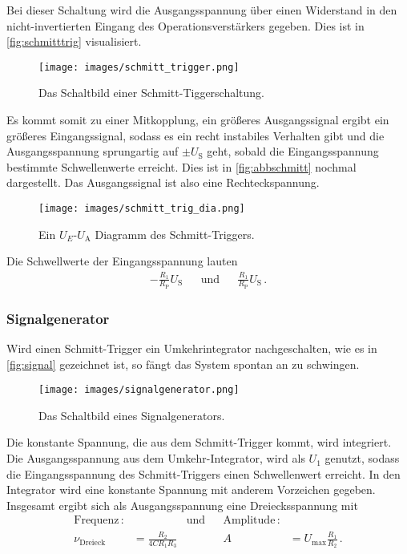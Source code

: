             \noindent 
            Bei dieser Schaltung wird die Ausgangsspannung über einen Widerstand in den nicht-invertierten Eingang des Operationsverstärkers gegeben.
            Dies ist in \autoref{fig:schmitttrig} visualisiert.
            \begin{figure}[H]
                \centering
                \texttt{[image: images/schmitt\_trigger.png]}
                \caption{Das Schaltbild einer Schmitt-Tiggerschaltung. \cite{V51}}
                \label{fig:schmitttrig}
            \end{figure}
            Es kommt somit zu einer Mitkopplung, ein größeres Ausgangssignal ergibt ein größeres Eingangssignal, sodass es ein recht instabiles Verhalten gibt 
            und die Ausgangsspannung sprungartig auf $\pm U_\text{S}$ geht, sobald die Eingangsspannung bestimmte Schwellenwerte erreicht. 
            Dies ist in \autoref{fig:abbschmitt} nochmal dargestellt. Das Ausgangssignal ist also eine Rechteckspannung.
            \begin{figure}[H]
                \centering
                \texttt{[image: images/schmitt\_trig\_dia.png]}
                \caption{Ein $U_E$-$U_\text{A}$ Diagramm des Schmitt-Triggers. \cite{Joachim}}
                \label{fig:abbschmitt}
            \end{figure}
            Die Schwellwerte der Eingangsspannung lauten 
            \begin{align*}
                - \frac{R_1}{R_\text{P}} U_\text{S} && \text{und} && \frac{R_1}{R_\text{P}} U_\text{S} \, .
            \end{align*}

        \subsubsection{Signalgenerator}

            \noindent 
            Wird einen Schmitt-Trigger ein Umkehrintegrator nachgeschalten, wie es in \autoref{fig:signal} gezeichnet ist, so fängt das System spontan an zu 
            schwingen. 
            \begin{figure}[H]
                \centering
                \texttt{[image: images/signalgenerator.png]}
                \caption{Das Schaltbild eines Signalgenerators. \cite{V51}}
                \label{fig:signal}
            \end{figure}
            Die konstante Spannung, die aus dem Schmitt-Trigger kommt, wird integriert. 
            Die Ausgangsspannung aus dem Umkehr-Integrator, wird als $U_1$ genutzt, sodass die Eingangsspannung des Schmitt-Triggers einen
            Schwellenwert erreicht. 
            In den Integrator wird eine konstante Spannung mit anderem Vorzeichen gegeben. 
            Insgesamt ergibt sich als Ausgangsspannung eine Dreiecksspannung mit 
            \begin{align*}
                \text{Frequenz}\, : & & \text{und} & & \text{Amplitude}\, :& \\
                \nu_\text{Dreieck} &= \frac{R_2}{4 C R_1 R_3} & & &A &=  U_\text{max} \frac{R_1}{R_2} \, .
            \end{align*}
